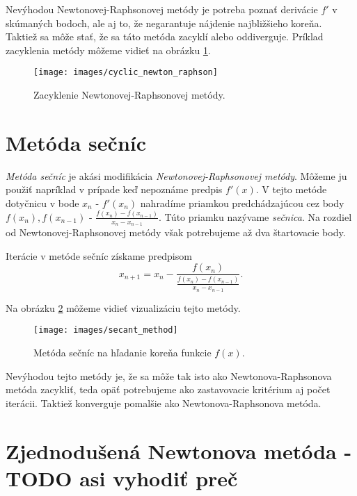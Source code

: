 Nevýhodou Newtonovej-Raphsonovej metódy je potreba poznať derivácie $f'$ v skúmaných bodoch, ale aj to, 
že negarantuje nájdenie
najbližšieho koreňa. Taktiež sa môže stať, že sa táto metóda zacyklí alebo oddiverguje. 
Príklad zacyklenia metódy môžeme vidieť
na obrázku \ref{obr:cyclic_newton_raphson}.

\begin{figure}
    \centerline{\texttt{[image: images/cyclic\_newton\_raphson]}}
    \caption[Zacyklenie Newtonovej-Raphsonovej metódy]{Zacyklenie Newtonovej-Raphsonovej metódy.}
    \label{obr:cyclic_newton_raphson}
\end{figure}
\iffalse

\section{Metóda sečníc}

\textit{Metóda sečníc} je akási modifikácia \textit{Newtonovej-Raphsonovej metódy}. 
Môžeme ju použiť napríklad v prípade keď nepoznáme predpis $f'(x)$. 
V tejto metóde dotyčnicu v bode $x_n$ - $f'(x_n)$ nahradíme priamkou 
predchádzajúcou cez body $f(x_n), f(x_{n-1})$ - $\frac{f(x_n) - f(x_{n-1})}{x_n - x_{n-1}}$. 
Túto priamku nazývame \textit{sečnica}. 
Na rozdiel od Newtonovej-Raphsonovej metódy však potrebujeme až dva štartovacie body.

Iterácie v metóde sečníc získame predpisom
$$ x_{n+1} = x_n - \frac{f(x_n)}{\frac{f(x_n) - f(x_{n-1})}{x_n - x_{n-1}}}.$$

Na obrázku \ref{obr:secant_method} môžeme vidieť vizualizáciu tejto metódy.

\begin{figure}
    \centerline{\texttt{[image: images/secant\_method]}}
    \caption[Metóda sečníc]{Metóda sečníc na hľadanie koreňa funkcie $f(x)$.}
    \label{obr:secant_method}
\end{figure}

Nevýhodou tejto metódy je, že sa môže tak isto ako Newtonova-Raphsonova metóda zacykliť, teda 
opäť potrebujeme ako zastavovacie kritérium aj počet iterácii. Taktiež konverguje
pomalšie ako Newtonova-Raphsonova metóda.

\section{Zjednodušená Newtonova metóda - TODO asi vyhodiť preč}


